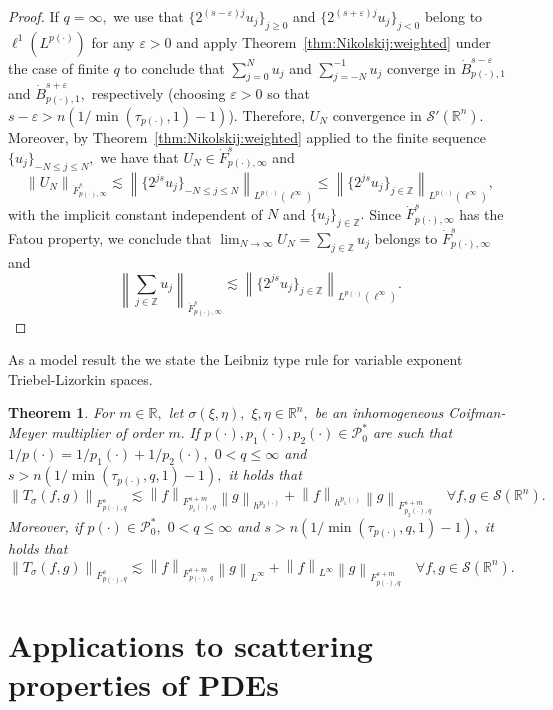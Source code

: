 \documentclass[10pt,a4paper]{article}
\newtheorem{theorem}{Theorem}[section]
\theoremstyle{remark}
\newcommand{\re}{\mathbb{R}}
\newcommand{\ent}{\mathbb{Z}}
\newcommand{\rn}{{{\mathbb R}^n}}
\newcommand{\sw}{{\mathcal{S}}(\rn)}
\newcommand{\tl}[3]{\dot F_{#1,#3}^{#2}} %
\newcommand{\itl}[3]{F_{#1,#3}^{#2}} %
\newcommand{\bes}[3]{\dot B_{#1,#3}^{#2}} %
\newcommand{\Lp}{L^{p(\cdot)}} %
\newcommand{\pp}{{p(\cdot)}}
\newcommand{\ppo}{{p_1(\cdot)}}
\newcommand{\ppt}{{p_2(\cdot)}}
\def\P{\mathcal P}
\newcommand{\norm}[2]{\left\|#1\right\|_{#2}}
\begin{document}
\begin{proof}
If $q=\infty,$  we use that $\{2^{(s-\varepsilon)j}u_j\}_{j\ge 0}$ and $\{2^{(s+\varepsilon)j}u_j\}_{j< 0}$ belong to $\ell^1(\Lp)$ for any $\varepsilon>0$ and apply Theorem~\ref{thm:Nikolskij:weighted} under the case of finite $q$ to conclude that $\sum_{j=0}^Nu_j$ and $\sum_{j=-N}^{-1}u_j$ converge in $\bes{\pp}{s-\varepsilon}{1}$ and $\bes{\pp}{s+\varepsilon}{1},$ respectively (choosing $\varepsilon>0$ so that $s-\varepsilon>n(1/\min(\tau_{\pp},1)-1)$). Therefore, $U_N$ convergence in $\mathcal{S}'(\rn).$ Moreover, by  Theorem~\ref{thm:Nikolskij:weighted} applied to the finite sequence $\{u_j\}_{-N\le j\le N},$ we have that $U_N\in \tl{\pp}{s}{\infty}$ and 
\[
\norm{U_N}{\tl{\pp}{s}{\infty}}\lesssim \norm{\{2^{js} u_j\}_{-N\le j\le N}}{\Lp(\ell^\infty)}\le \norm{\{2^{js} u_j\}_{j\in \ent}}{\Lp(\ell^\infty)},
\]
with the implicit constant independent of $N$ and $\{u_j\}_{j\in\ent}.$
Since $\tl{\pp}{s}{\infty}$ has the Fatou property, we conclude that $\lim_{N\to \infty} U_N=\sum_{j\in\ent}u_j$ belongs to $\tl{\pp}{s}{\infty}$ and 
\[
\norm{\sum_{j\in\ent}u_j}{\tl{\pp}{s}{\infty}}\lesssim  \norm{\{2^{js} u_j\}_{j\in \ent}}{\Lp(\ell^\infty)}.
\]
\end{proof}

As a model result the we state the Leibniz type rule for variable exponent Triebel-Lizorkin spaces.

\begin{theorem} \label{thm:ICM:variable} For $m \in \re,$ let $\sigma(\xi,\eta),$ $\xi,\eta\in\rn,$ be an inhomogeneous Coifman-Meyer multiplier of order $m.$ If  $\pp,\ppo,\ppt\in \P_0^*$  are such that $ {1}/{\pp} = {1}/{\ppo} + {1}/{\ppt},$   $0 < q \le \infty$ and  
$s > n(1/\min(\tau_{\pp},q,1)-1),$  it holds that
\begin{equation*}
\norm{T_\sigma(f,g)}{\itl{\pp}{s}{q}} \lesssim \norm{f}{\itl{\ppo}{s+m}{q}} \norm{g}{h^{\ppt}} +  \norm{f}{h^{\ppo}}   \norm{g}{\itl{\ppt}{s+m}{q}} \quad \forall f, g \in \sw.
\end{equation*}
Moreover, if $\pp\in \P_0^*,$     $0 < q \le \infty$ and  
$s > n(1/\min(\tau_{\pp},q,1)-1),$  it holds that
\begin{equation*}
\norm{T_\sigma(f,g)}{\itl{\pp}{s}{q}} \lesssim \norm{f}{\itl{\pp}{s+m}{q}} \norm{g}{L^\infty} +  \norm{f}{L^\infty}   \norm{g}{\itl{\pp}{s+m}{q}} \quad \forall f, g \in \sw.
\end{equation*}
\end{theorem}

 \section{Applications to scattering properties of PDEs}\label{ch2_applications}
\end{document}
